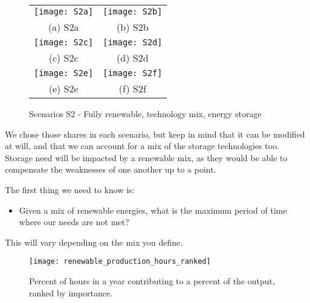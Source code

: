 \begin{figure*}
\begin{tabular}{cc}
  \texttt{[image: S2a]} &   \texttt{[image: S2b]} \\
(a) S2a & (b) S2b \\[6pt]
 \texttt{[image: S2c]} &   \texttt{[image: S2d]} \\
(c) S2c & (d) S2d \\[6pt]
 \texttt{[image: S2e]} &   \texttt{[image: S2f]} \\
(e) S2e & (f) S2f \\[6pt]
\end{tabular}
\caption{Scenarios S2 - Fully renewable, technology mix, energy storage}
\end{figure*}

We chose those shares in each scenario, but keep in mind that it can be modified at will, and that we can account for a mix of the storage technologies too. Storage need will be impacted by a renewable mix, as they would be able to compensate the weaknesses of one another up to a point.



The first thing we need to know is:

\begin{itemize}
\item Given a mix of renewable energies, what is the maximum period of time where our needs are not met?
\end{itemize}

This will vary depending on the mix you define.


\begin{figure}[ht]
	\texttt{[image: renewable\_production\_hours\_ranked]}
	\caption[Percent of hours in a year contributing to a percent of the output, ranked by importance]{Percent of hours in a year contributing to a percent of the output, ranked by importance.}
\end{figure}

